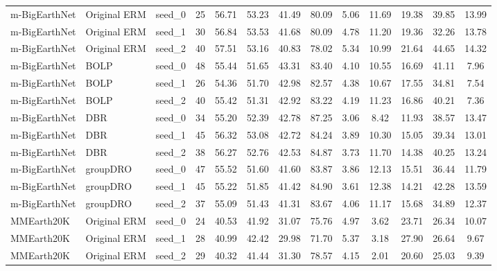 \documentclass[11pt]{article}
\begin{document}
\begin{table}[h!]
{\begin{tabular}{lllcccccccccc}
\midrule

m-BigEarthNet & Original ERM & seed\_0 & 25 & 56.71 & 53.23 & 41.49 & 80.09 & 5.06 & 11.69 & 19.38 & 39.85 & 13.99 \\
m-BigEarthNet & Original ERM & seed\_1 & 30 & 56.84 & 53.53 & 41.68 & 80.09 & 4.78 & 11.20 & 19.36 & 32.26 & 13.78 \\
m-BigEarthNet & Original ERM & seed\_2 & 40 & 57.51 & 53.16 & 40.83 & 78.02 & 5.34 & 10.99 & 21.64 & 44.65 & 14.32 \\

m-BigEarthNet & BOLP & seed\_0 & 48 & 55.44 & 51.65 & 43.31 & 83.40 & 4.10 & 10.55 & 16.69 & 41.11 & 7.96 \\
m-BigEarthNet & BOLP & seed\_1 & 26 & 54.36 & 51.70 & 42.98 & 82.57 & 4.38 & 10.67 & 17.55 & 34.81 & 7.54 \\
m-BigEarthNet & BOLP & seed\_2 & 40 & 55.42 & 51.31 & 42.92 & 83.22 & 4.19 & 11.23 & 16.86 & 40.21 & 7.36 \\

m-BigEarthNet & DBR & seed\_0 & 34 & 55.20 & 52.39 & 42.78 & 87.25 & 3.06 & 8.42 & 11.93 & 38.57 & 13.47 \\
m-BigEarthNet & DBR & seed\_1 & 45 & 56.32 & 53.08 & 42.72 & 84.24 & 3.89 & 10.30 & 15.05 & 39.34 & 13.01 \\
m-BigEarthNet & DBR & seed\_2 & 38 & 56.27 & 52.76 & 42.53 & 84.87 & 3.73 & 11.70 & 14.38 & 40.25 & 13.24 \\

m-BigEarthNet & groupDRO & seed\_0 & 47 & 55.52 & 51.60 & 41.60 & 83.87 & 3.86 & 12.13 & 15.51 & 36.44 & 11.79 \\
m-BigEarthNet & groupDRO & seed\_1 & 45 & 55.22 & 51.85 & 41.42 & 84.90 & 3.61 & 12.38 & 14.21 & 42.28 & 13.59 \\
m-BigEarthNet & groupDRO & seed\_2 & 37 & 55.09 & 51.43 & 41.31 & 83.67 & 4.06 & 11.17 & 15.68 & 34.89 & 12.37 \\

\midrule

MMEarth20K & Original ERM & seed\_0 & 24 & 40.53 & 41.92 & 31.07 & 75.76 & 4.97 & 3.62 & 23.71 & 26.34 & 10.07 \\
MMEarth20K & Original ERM & seed\_1 & 28 & 40.99 & 42.42 & 29.98 & 71.70 & 5.37 & 3.18 & 27.90 & 26.64 & 9.67 \\
MMEarth20K & Original ERM & seed\_2 & 29 & 40.32 & 41.44 & 31.30 & 78.57 & 4.15 & 2.01 & 20.60 & 25.03 & 9.39 \\


\end{tabular}}
\end{table}
\end{document}
